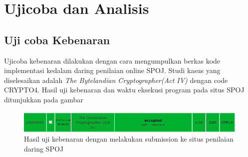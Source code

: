 \section{Ujicoba dan Analisis}

\subsection{Uji coba Kebenaran}
Ujicoba kebenaran dilakukan dengan cara mengumpulkan berkas kode implementasi kedalam daring penilaian online SPOJ. Studi kasus yang diselesaikan adalah \textit{The Bytelandian Cryptographer(Act IV)} dengan code CRYPTO4. Hasil uji kebenaran dan waktu eksekusi program pada situs SPOJ ditunjukkan pada gambar
\begin{figure}[H]
\centering
\includegraphics[scale=0.3]{images/best.png}
\caption{Hasil uji kebenaran dengan melakukan submission ke situs penilaian daring SPOJ}
\label{fig:best}
\end{figure}

